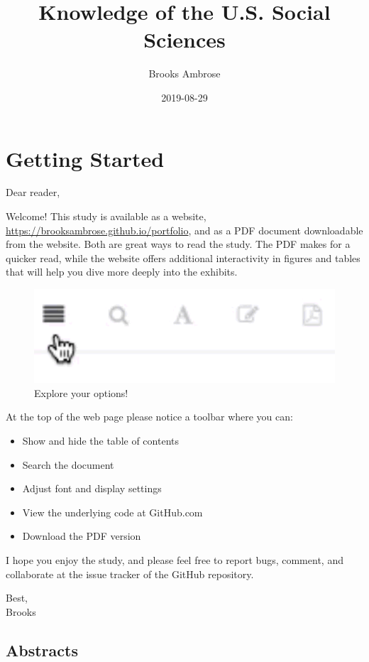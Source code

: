 \documentclass[]{book}
\title{Knowledge of the U.S. Social Sciences}
\author{Brooks Ambrose}
\date{2019-08-29}
\providecommand{\tightlist}{%
  \setlength{\itemsep}{0pt}\setlength{\parskip}{0pt}}
\theoremstyle{definition}
\theoremstyle{definition}
\theoremstyle{definition}
\theoremstyle{remark}
\begin{document}
\maketitle

{
\setcounter{tocdepth}{2}
\tableofcontents
}
\listoftables
\listoffigures
\hypertarget{getting-started}{%
\chapter*{Getting Started}\label{getting-started}}


Dear reader,

Welcome! This study is available as a website,
\url{https://brooksambrose.github.io/portfolio}, and as a PDF document
downloadable from the website. Both are great ways to read the study.
The PDF makes for a quicker read, while the website offers additional
interactivity in figures and tables that will help you dive more deeply
into the exhibits.

\begin{figure}

{\centering \includegraphics[width=0.3\linewidth]{img/toolbar} 

}

\caption{Explore your options!}\label{fig:toolbar}
\end{figure}

At the top of the web page please notice a toolbar where you can:

\begin{itemize}
\tightlist
\item
  Show and hide the table of contents
\item
  Search the document
\item
  Adjust font and display settings
\item
  View the underlying code at GitHub.com
\item
  Download the PDF version
\end{itemize}

I hope you enjoy the study, and please feel free to report bugs,
comment, and collaborate at the issue tracker of the GitHub repository.

Best,\\
Brooks

\hypertarget{abstracts}{%
\section*{Abstracts}\label{abstracts}}
\end{document}
